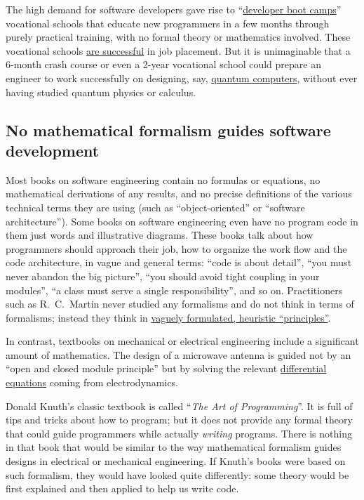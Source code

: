 The high demand for software developers gave rise to ``\href{https://cvbj.biz/2018/03/15/demand-software-developers-continues-soar-heres-cheapest-free-way-start-tech-career/}{developer boot camps}''
\textendash{} vocational schools that educate new programmers in a
few months through purely practical training, with no formal theory
or mathematics involved. These vocational schools \href{https://www.fullstackacademy.com/blog/why-are-some-coding-bootcamps-job-placement-rates-so-high}{are successful}
in job placement. But it is unimaginable that a 6-month crash course
or even a 2-year vocational school could prepare an engineer to work
successfully on designing, say, \href{https://www.dwavesys.com/quantum-computing}{quantum computers},
without ever having studied quantum physics or calculus.

\subsection{No mathematical formalism guides software development}

Most books on software engineering contain no formulas or equations,
no mathematical derivations of any results, and no precise definitions
of the various technical terms they are using (such as ``object-oriented''
or ``software architecture''). Some books on software engineering
even have no program code in them \textendash{} just words and illustrative
diagrams. These books talk about how programmers should approach their
job, how to organize the work flow and the code architecture, in vague
and general terms: ``code is about detail'', ``you must never abandon
the big picture'', ``you should avoid tight coupling in your modules'',
``a class must serve a single responsibility'', and so on. Practitioners
such as R.\ C.\ Martin never studied any formalisms and do not think
in terms of formalisms; instead they think in \href{https://blog.cleancoder.com/uncle-bob/2016/03/19/GivingUpOnTDD.html}{vaguely formulated, heuristic \textquotedblleft principles\textquotedblright}.

In contrast, textbooks on mechanical or electrical engineering include
a significant amount of mathematics. The design of a microwave antenna
is guided not by an ``open and closed module principle'' but by
solving the relevant \href{https://youtu.be/8KpfVsJ5Jw4?t=447}{differential equations}
coming from electrodynamics.

Donald Knuth's classic textbook is called ``\emph{The Art of Programming}''.
It is full of tips and tricks about how to program; but it does not
provide any formal theory that could guide programmers while actually
\emph{writing} programs. There is nothing in that book that would
be similar to the way mathematical formalism guides designs in electrical
or mechanical engineering. If Knuth's books were based on such formalism,
they would have looked quite differently: some theory would be first
explained and then applied to help us write code.

